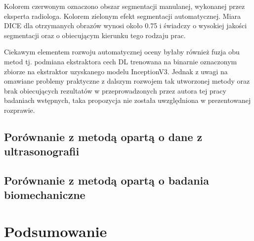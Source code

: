Kolorem czerwonym oznaczono obszar segmentacji manulanej, wykonanej przez eksperta radiologa. Kolorem zielonym efekt segmentacji automatycznej. Miara DICE dla otrzymanych obrazów wynosi około 0.75 i świadczy o wysokiej jakości segmentacji oraz o obiecującym kierunku tego rodzaju prac.

Ciekawym elementem rozwoju automatycznej oceny byłaby również fuzja obu metod tj. podmiana ekstraktora cech DL trenowana na binarnie oznaczonym zbiorze na ekstraktor uzyskanego modelu InceptionV3. Jednak z uwagi na omawiane problemy praktyczne z dalszym rozwojem tak utworzonej metody oraz brak obiecujących rezultatów w przeprowadzonych przez autora tej pracy badaniach wstępnych, taka propozycja nie została uwzględniona w prezentowanej rozprawie. 

\section{Porównanie z metodą opartą o dane z ultrasonografii}
\section{Porównanie z metodą opartą o badania biomechaniczne}


\chapter{Podsumowanie}

